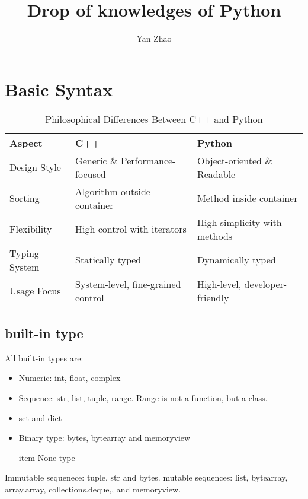 \documentclass[a4paper,12pt,twoside]{book}
\begin{document}

\title{Drop of knowledges of Python}
\author{Yan Zhao}
\date{}\maketitle


	
\chapter{Basic Syntax} 
\begin{table}[h!]
	\centering
	\begin{tabular}{|l|l|l|}
		\hline
		\textbf{Aspect} & \textbf{C++} & \textbf{Python} \\
		\hline
		Design Style & Generic \& Performance-focused & Object-oriented \& Readable \\
		\hline
		Sorting & Algorithm outside container & Method inside container \\
		\hline
		Flexibility & High control with iterators & High simplicity with methods \\
		\hline
		Typing System & Statically typed & Dynamically typed \\
		\hline
		Usage Focus & System-level, fine-grained control & High-level, developer-friendly \\
		\hline
	\end{tabular}
	\caption{Philosophical Differences Between C++ and Python}
\end{table}

\section{built-in type}

All built-in types are:
\begin{itemize}
	\item Numeric: int, float, complex
	
	\item Sequence: str, list, tuple, range. Range is not a function, but a class.
	
	\item set and dict
	
	\item Binary type: bytes, bytearray and memoryview
	
	item None type
\end{itemize}
Immutable sequenece: tuple, str and bytes. mutable sequences: list, bytearray, array.array, collections.deque,, and memoryview.
 
\end{document}
